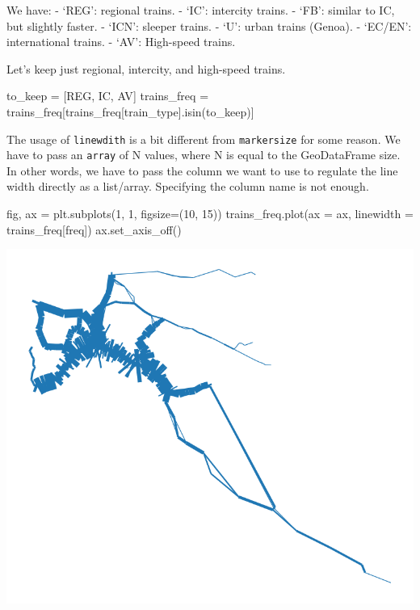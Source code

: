 \documentclass[
  letterpaper,
  DIV=11,
  numbers=noendperiod]{scrreprt}
\newenvironment{Shaded}{\begin{snugshade}}{\end{snugshade}}
\newcommand{\DecValTok}[1]{\textcolor[rgb]{0.68,0.00,0.00}{#1}}
\newcommand{\NormalTok}[1]{\textcolor[rgb]{0.00,0.23,0.31}{#1}}
\newcommand{\OperatorTok}[1]{\textcolor[rgb]{0.37,0.37,0.37}{#1}}
\newcommand{\StringTok}[1]{\textcolor[rgb]{0.13,0.47,0.30}{#1}}
\begin{document}
We have: - `REG': regional trains. - `IC': intercity trains. - `FB':
similar to IC, but slightly faster. - `ICN': sleeper trains. - `U':
urban trains (Genoa). - `EC/EN': international trains. - `AV':
High-speed trains.

Let's keep just regional, intercity, and high-speed trains.

\begin{Shaded}
\begin{Highlighting}[]
\NormalTok{to\_keep }\OperatorTok{=}\NormalTok{ [}\StringTok{\textquotesingle{}REG\textquotesingle{}}\NormalTok{, }\StringTok{\textquotesingle{}IC\textquotesingle{}}\NormalTok{, }\StringTok{\textquotesingle{}AV\textquotesingle{}}\NormalTok{]}
\NormalTok{trains\_freq }\OperatorTok{=}\NormalTok{ trains\_freq[trains\_freq[}\StringTok{\textquotesingle{}train\_type\textquotesingle{}}\NormalTok{].isin(to\_keep)]}
\end{Highlighting}
\end{Shaded}

The usage of \texttt{linewdith} is a bit different from
\texttt{markersize} for some reason. We have to pass an \texttt{array}
of N values, where N is equal to the GeoDataFrame size. In other words,
we have to pass the column we want to use to regulate the line width
directly as a list/array. Specifying the column name is not enough.

\begin{Shaded}
\begin{Highlighting}[]
\NormalTok{fig, ax }\OperatorTok{=}\NormalTok{ plt.subplots(}\DecValTok{1}\NormalTok{, }\DecValTok{1}\NormalTok{, figsize}\OperatorTok{=}\NormalTok{(}\DecValTok{10}\NormalTok{, }\DecValTok{15}\NormalTok{))}
\NormalTok{trains\_freq.plot(ax }\OperatorTok{=}\NormalTok{ ax, linewidth }\OperatorTok{=}\NormalTok{ trains\_freq[}\StringTok{\textquotesingle{}freq\textquotesingle{}}\NormalTok{])}
\NormalTok{ax.set\_axis\_off()}
\end{Highlighting}
\end{Shaded}

\includegraphics{labs/w02_maps_files/figure-pdf/cell-55-output-1.png}
\end{document}
